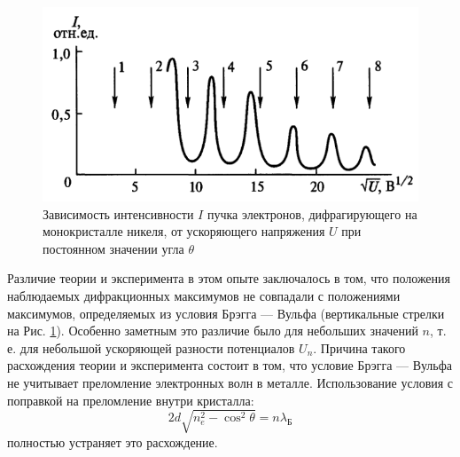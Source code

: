 \begin{figure}[H]
	\centering
	\includegraphics[width=0.5\linewidth]{img/oral-05/devison-djermer-intensivnost-u}
	\caption{Зависимость интенсивности $I$ пучка электронов, дифрагирующего на монокристалле никеля, от ускоряющего напряжения $U$ при постоянном значении угла $\theta$}
	\label{fig:devison-djermer-intensivnost-u}
\end{figure}
Различие теории и эксперимента в этом опыте заключалось в том, что положения наблюдаемых дифракционных максимумов не совпадали с положениями максимумов, определяемых из условия Брэгга — Вульфа (вертикальные стрелки на Рис. \ref{fig:devison-djermer-intensivnost-u}). Особенно заметным это различие было для небольших значений $n$, т. е. для небольшой ускоряющей разности потенциалов $U_n$. Причина такого расхождения теории и эксперимента состоит в том, что условие Брэгга — Вульфа не учитывает преломление электронных волн в металле. 
Использование условия с поправкой на преломление внутри кристалла:
\begin{equation*}
	2d\sqrt{n_e^2-\cos^2\theta}=n\lambda_{\text{Б}}
\end{equation*}
полностью устраняет это расхождение.

